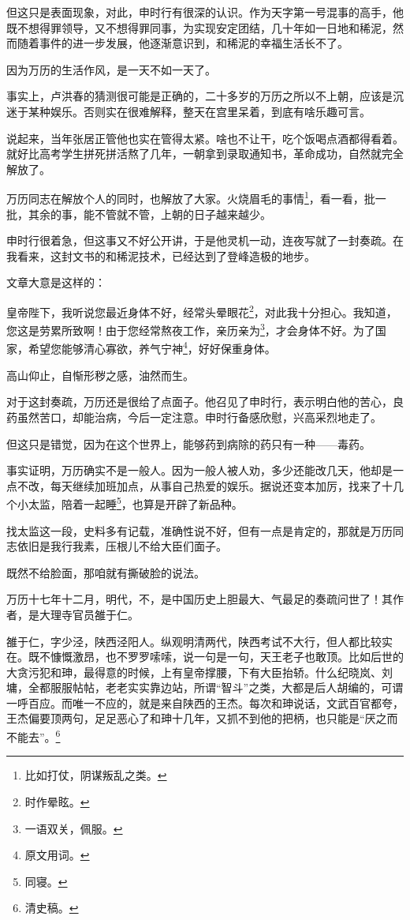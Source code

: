 \begin{multicols}{\theparacolNo}
但这只是表面现象，对此，申时行有很深的认识。作为天字第一号混事的高手，他既不想得罪领导，又不想得罪同事，为实现安定团结，几十年如一日地和稀泥，然而随着事件的进一步发展，他逐渐意识到，和稀泥的幸福生活长不了。

因为万历的生活作风，是一天不如一天了。

事实上，卢洪春的猜测很可能是正确的，二十多岁的万历之所以不上朝，应该是沉迷于某种娱乐。否则实在很难解释，整天在宫里呆着，到底有啥乐趣可言。

说起来，当年张居正管他也实在管得太紧。啥也不让干，吃个饭喝点酒都得看着。就好比高考学生拼死拼活熬了几年，一朝拿到录取通知书，革命成功，自然就完全解放了。

万历同志在解放个人的同时，也解放了大家。火烧眉毛的事情\footnote{比如打仗，阴谋叛乱之类。}，看一看，批一批，其余的事，能不管就不管，上朝的日子越来越少。

申时行很着急，但这事又不好公开讲，于是他灵机一动，连夜写就了一封奏疏。在我看来，这封文书的和稀泥技术，已经达到了登峰造极的地步。

文章大意是这样的：

皇帝陛下，我听说您最近身体不好，经常头晕眼花\footnote{时作晕眩。}，对此我十分担心。我知道，您这是劳累所致啊！由于您经常熬夜工作，亲历亲为\footnote{一语双关，佩服。}，才会身体不好。为了国家，希望您能够清心寡欲，养气宁神\footnote{原文用词。}，好好保重身体。

高山仰止，自惭形秽之感，油然而生。

对于这封奏疏，万历还是很给了点面子。他召见了申时行，表示明白他的苦心，良药虽然苦口，却能治病，今后一定注意。申时行备感欣慰，兴高采烈地走了。

但这只是错觉，因为在这个世界上，能够药到病除的药只有一种——毒药。

事实证明，万历确实不是一般人。因为一般人被人劝，多少还能改几天，他却是一点不改，每天继续加班加点，从事自己热爱的娱乐。据说还变本加厉，找来了十几个小太监，陪着一起睡\footnote{同寝。}，也算是开辟了新品种。

找太监这一段，史料多有记载，准确性说不好，但有一点是肯定的，那就是万历同志依旧是我行我素，压根儿不给大臣们面子。

既然不给脸面，那咱就有撕破脸的说法。

万历十七年十二月，明代，不，是中国历史上胆最大、气最足的奏疏问世了！其作者，是大理寺官员雒于仁。

雒于仁，字少泾，陕西泾阳人。纵观明清两代，陕西考试不大行，但人都比较实在。既不慷慨激昂，也不罗罗嗦嗦，说一句是一句，天王老子也敢顶。比如后世的大贪污犯和珅，最得意的时候，上有皇帝撑腰，下有大臣抬轿。什么纪晓岚、刘墉，全都服服帖帖，老老实实靠边站，所谓“智斗”之类，大都是后人胡编的，可谓一呼百应。而唯一不应的，就是来自陕西的王杰。每次和珅说话，文武百官都夸，王杰偏要顶两句，足足恶心了和珅十几年，又抓不到他的把柄，也只能是“厌之而不能去”。\footnote{清史稿。}


\end{multicols}
